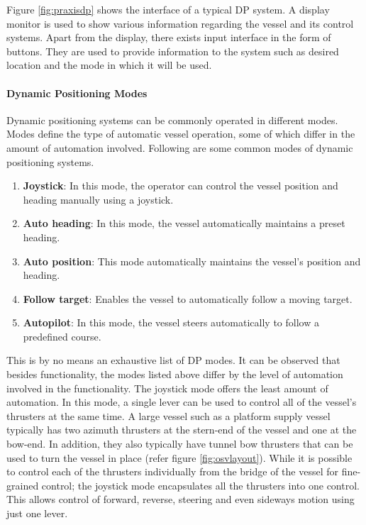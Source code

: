 
Figure \ref{fig:praxisdp} shows the interface of a typical DP system. A display monitor is used to show various information regarding the vessel and its control systems. Apart from the display, there exists input interface in the form of buttons. They are used to provide information to the system such as desired location and the mode in which it will be used. 

\paragraph{Dynamic Positioning Modes}
Dynamic positioning systems can be commonly operated in different modes. Modes define the type of automatic vessel operation, some of which differ in the amount of automation involved. Following are some common modes of dynamic positioning systems. 


\begin{enumerate}

\item \textbf{Joystick}: In this mode, the operator can control the vessel position and heading manually using a joystick. 
\item \textbf{Auto heading}: In this mode, the vessel automatically maintains a preset heading. 
\item \textbf{Auto position}: This mode automatically maintains the vessel's position and heading. 
\item \textbf{Follow target}: Enables the vessel to automatically follow a moving target. 
\item \textbf{Autopilot}: In this mode, the vessel steers automatically to follow a predefined course. 

\end{enumerate}

This is by no means an exhaustive list of DP modes. It can be observed that besides functionality, the modes listed above differ by the level of automation involved in the functionality. The joystick mode offers the least amount of automation. In this mode, a single lever can be used to control all of the vessel's thrusters at the same time. A large vessel such as a platform supply vessel typically has two azimuth thrusters at the stern-end of the vessel and one at the bow-end. In addition, they also typically have tunnel bow thrusters that can be used to turn the vessel in place (refer figure \ref{fig:osvlayout}). While it is possible to control each of the thrusters individually from the bridge of the vessel for fine-grained control; the joystick mode encapsulates all the thrusters into one control. This allows control of forward, reverse, steering and even sideways motion using just one lever. 

